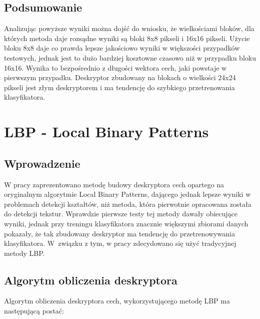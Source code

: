 \subsection{Podsumowanie}
Analizując powyższe wyniki można dojść do wniosku, że wielkościami bloków, dla których metoda daje rozsądne wyniki są bloki 8x8 pikseli i 16x16 pikseli. Użycie bloku 8x8 daje co prawda lepsze jakościowo wyniki w większości przypadków testowych, jednak jest to dużo bardziej kosztowne czasowo niż w przypadku bloku 16x16. Wynika to bezpośrednio z długości wektora cech, jaki powstaje w pierwszym przypadku. Deskryptor zbudowany na blokach o wielkości 24x24 pikseli jest złym deskryptorem i ma tendencję do szybkiego przetrenowania klasyfikatora.

\clearpage

\section{LBP - Local Binary Patterns}
\label{sec:lbp}

\subsection{Wprowadzenie}
W pracy \cite{Mu08} zaprezentowano metodę budowy deskryptora cech opartego na oryginalnym algorytmie Local Binary Patterns, dającego jednak lepsze wyniki w problemach detekcji kształtów, niż metoda, która pierwotnie opracowana została do detekcji tekstur. Wprawdzie pierwsze testy tej metody dawały obiecujące wyniki, jednak przy treningu klasyfikatora znacznie większymi zbiorami danych pokazały, że tak zbudowany deskryptor ma tendencję do przetrenowywania klasyfikatora.
W~związku z tym, w pracy zdecydowano się użyć tradycyjnej metody LBP.

\subsection{Algorytm obliczenia deskryptora}

Algorytm obliczenia deskryptora cech, wykorzystującego metodę LBP ma następującą postać:

